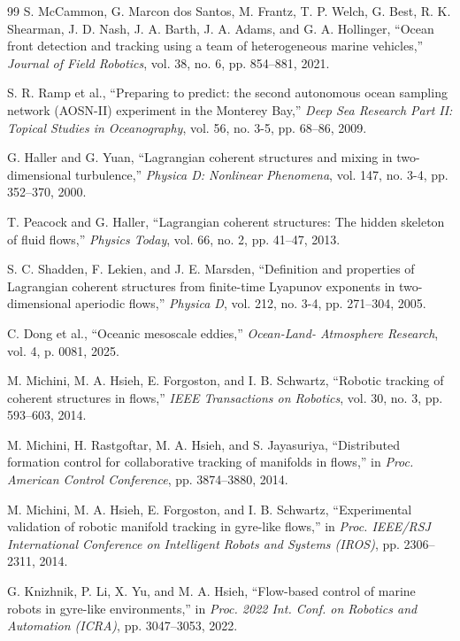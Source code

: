 \documentclass[lettersize,journal]{IEEEtran}
\begin{document}
\begin{thebibliography}{99}
 S. McCammon, G. Marcon dos Santos, M. Frantz, T. P. Welch,
G. Best, R. K. Shearman, J. D. Nash, J. A. Barth, J. A. Adams, and
G. A. Hollinger, ``Ocean front detection and tracking using a
team of heterogeneous marine vehicles,'' \textit{Journal of Field Robotics},
vol. 38, no. 6, pp. 854--881, 2021.

 S. R. Ramp et al., ``Preparing to predict: the second autonomous
ocean sampling network (AOSN-II) experiment in the Monterey Bay,''
\textit{Deep Sea Research Part II: Topical Studies in Oceanography}, vol. 56,
no. 3-5, pp. 68--86, 2009.

 G. Haller and G. Yuan, ``Lagrangian coherent structures and mixing
in two-dimensional turbulence,'' \textit{Physica D: Nonlinear Phenomena},
vol. 147, no. 3-4, pp. 352--370, 2000.

 T. Peacock and G. Haller, ``Lagrangian coherent structures: The
hidden skeleton of fluid flows,'' \textit{Physics Today}, vol. 66, no. 2,
pp. 41--47, 2013.

 S. C. Shadden, F. Lekien, and J. E. Marsden, ``Definition and
properties of Lagrangian coherent structures from finite-time Lyapunov
exponents in two-dimensional aperiodic flows,'' \textit{Physica D}, vol. 212,
no. 3-4, pp. 271--304, 2005.

 C. Dong et al., ``Oceanic mesoscale eddies,'' \textit{Ocean-Land-
Atmosphere Research}, vol. 4, p. 0081, 2025.

 M. Michini, M. A. Hsieh, E. Forgoston, and I. B. Schwartz,
``Robotic tracking of coherent structures in flows,'' \textit{IEEE Transactions
on Robotics}, vol. 30, no. 3, pp. 593--603, 2014.

 M. Michini, H. Rastgoftar, M. A. Hsieh, and S. Jayasuriya,
``Distributed formation control for collaborative tracking of manifolds in
flows,'' in \textit{Proc. American Control Conference}, pp. 3874--3880, 2014.

 M. Michini, M. A. Hsieh, E. Forgoston, and I. B. Schwartz,
``Experimental validation of robotic manifold tracking in gyre-like flows,''
in \textit{Proc. IEEE/RSJ International Conference on Intelligent Robots
and Systems (IROS)}, pp. 2306--2311, 2014.

 G. Knizhnik, P. Li, X. Yu, and M. A. Hsieh, ``Flow-based control
of marine robots in gyre-like environments,'' in \textit{Proc. 2022 Int. Conf.
on Robotics and Automation (ICRA)}, pp. 3047--3053, 2022.


\end{thebibliography}
\end{document}
